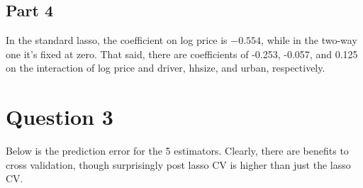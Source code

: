 \documentclass{article}
\begin{document}
\subsection{Part 4}
In the standard lasso, the coefficient on log price is $-0.554$, while in the two-way one it's fixed at zero. That said, there are coefficients of -0.253, -0.057, and 0.125 on the interaction of log price and driver, hhsize, and urban, respectively.
\section{Question 3}
Below is the prediction error for the 5 estimators. Clearly, there are benefits to cross validation, though surprisingly post lasso CV is higher than just the lasso CV. 

\end{document}

